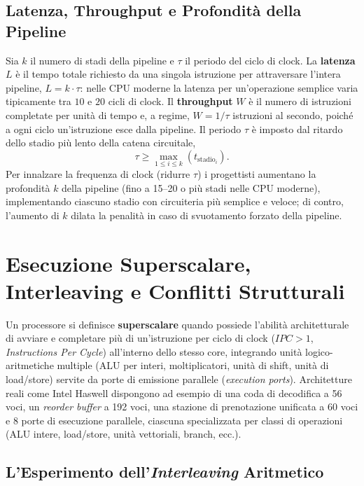 \subsection{Latenza, Throughput e Profondit\`a della Pipeline}

Sia $k$ il numero di stadi della pipeline e $\tau$ il periodo del ciclo di clock. La \textbf{latenza} $L$ \`e il tempo totale richiesto da una singola istruzione per attraversare l'intera pipeline, $L = k \cdot \tau$: nelle CPU moderne la latenza per un'operazione semplice varia tipicamente tra $10$ e $20$ cicli di clock. Il \textbf{throughput} $W$ \`e il numero di istruzioni completate per unit\`a di tempo e, a regime, $W = 1/\tau$ istruzioni al secondo, poich\'e a ogni ciclo un'istruzione esce dalla pipeline. Il periodo $\tau$ \`e imposto dal ritardo dello stadio pi\`u lento della catena circuitale,
\[
\tau \ge \max_{1 \le i \le k} \left(t_{\text{stadio}_i}\right).
\]
Per innalzare la frequenza di clock (ridurre $\tau$) i progettisti aumentano la profondit\`a $k$ della pipeline (fino a 15--20 o pi\`u stadi nelle CPU moderne), implementando ciascuno stadio con circuiteria pi\`u semplice e veloce; di contro, l'aumento di $k$ dilata la penalit\`a in caso di svuotamento forzato della pipeline.

\FloatBarrier
\section{Esecuzione Superscalare, Interleaving e Conflitti Strutturali}

Un processore si definisce \textbf{superscalare} quando possiede l'abilit\`a architetturale di avviare e completare pi\`u di un'istruzione per ciclo di clock ($IPC > 1$, \textit{Instructions Per Cycle}) all'interno dello stesso core, integrando unit\`a logico-aritmetiche multiple (ALU per interi, moltiplicatori, unit\`a di shift, unit\`a di load/store) servite da porte di emissione parallele (\textit{execution ports}). Architetture reali come Intel Haswell dispongono ad esempio di una coda di decodifica a 56 voci, un \textit{reorder buffer} a 192 voci, una stazione di prenotazione unificata a 60 voci e 8 porte di esecuzione parallele, ciascuna specializzata per classi di operazioni (ALU intere, load/store, unit\`a vettoriali, branch, ecc.).

\subsection{L'Esperimento dell'\textit{Interleaving} Aritmetico}

